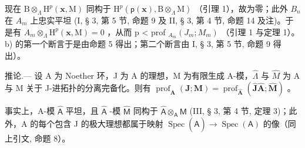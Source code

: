 现在 \(\mathrm{B}\otimes_{\Lambda}\mathrm{H}^{p}(\mathbf{x},\mathrm{M})\) 同构于 \(\mathrm{H}^{p}(\mathsf{p}(\mathbf{x}),\mathrm{B}\otimes_{\Lambda}\mathrm{M})\) （引理 1），故为零；此外 \(B_{n}\) 在 \(A_{m}\) 上忠实平坦 (I, § 3, 第 5 节, 命题 9 及 II, § 3, 第 4 节, 命题 14 及注)。于是有 \(A_{m}\otimes_{\Lambda}\mathrm{H}^{p}(\mathbf{x},\mathrm{M})=0\) ，从而 p \textless{} prof \(_{A_{m}}(J_{m};M_{m})\) （引理 1 与定理 1）。b) 的第一个断言于是由命题 5 得出；第二个断言由 I, § 3, 第 5 节, 命题 9 得出）。

推论.--- 设 A 为 Noether 环，J 为 A 的理想，M 为有限生成 A-模，\(\widehat{\Lambda}\) 与 \(\widehat{M}\) 为 A 与 M 关于 J-进拓扑的分离完备化。则有 \(\operatorname{prof}_{\mathbf{A}}(\mathbf{J};\mathbf{M}) = \operatorname{prof}_{\widehat{\mathbf{A}}}(\widehat{\mathbf{J}}\widehat{\mathbf{A}};\widehat{\mathbf{M}})\) 。

事实上，A-模 \(\widehat{\mathsf{A}}\) 平坦，且 \(\widehat{\mathsf{A}}\) -模 \(\widehat{\mathsf{M}}\) 同构于 \(\widehat{\mathsf{A}}\otimes_{\mathsf{A}}\mathsf{M}\) (III, § 3, 第 4 节, 定理 3)；此外，A 的每个包含 J 的极大理想都属于映射 \(\operatorname{Spec}(\widehat{\mathsf{A}})\to\operatorname{Spec}(\mathsf{A})\) 的像（同上引文, 命题 8）。

